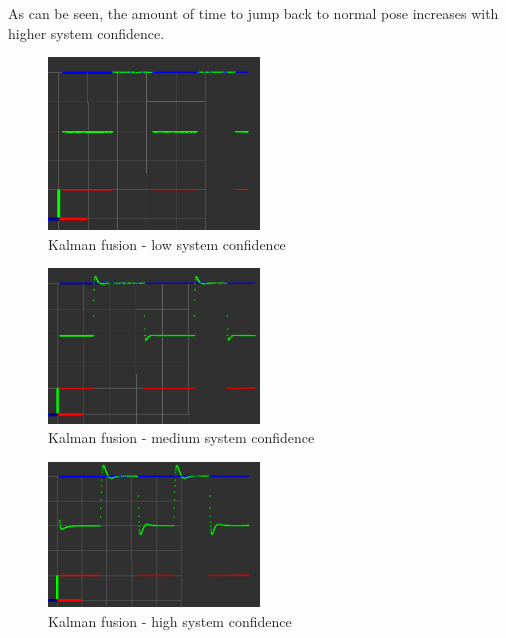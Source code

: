As can be seen, the amount of time to jump back to normal pose increases with higher system confidence.

\begin{figure}[thpb]
      \centering
      \includegraphics[width=0.5\textwidth]{graphics/kalman_fast.png}
      \caption{Kalman fusion - low system confidence}
      \label{Fig: Kalman Fusion - Low}
   \end{figure}

\begin{figure}[thpb]
      \centering
      \includegraphics[width=0.5\textwidth]{graphics/kalman_medium.png}
      \caption{Kalman fusion - medium system confidence}
      \label{Fig: Kalman Fusion - Medium}
   \end{figure}
	
\begin{figure}[thpb]
      \centering
      \includegraphics[width=0.5\textwidth]{graphics/kalman_slow.png}
      \caption{Kalman fusion - high system confidence}
      \label{Fig: Kalman Fusion - High}
   \end{figure}

